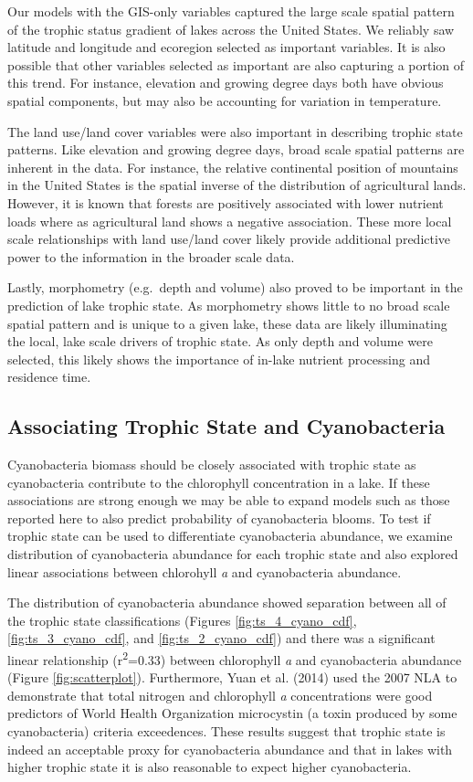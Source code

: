 \documentclass[11pt,]{article}
\begin{document}
Our models with the GIS-only variables captured the large scale spatial
pattern of the trophic status gradient of lakes across the United
States. We reliably saw latitude and longitude and ecoregion selected as
important variables. It is also possible that other variables selected
as important are also capturing a portion of this trend. For instance,
elevation and growing degree days both have obvious spatial components,
but may also be accounting for variation in temperature.

The land use/land cover variables were also important in describing
trophic state patterns. Like elevation and growing degree days, broad
scale spatial patterns are inherent in the data. For instance, the
relative continental position of mountains in the United States is the
spatial inverse of the distribution of agricultural lands. However, it
is known that forests are positively associated with lower nutrient
loads where as agricultural land shows a negative association. These
more local scale relationships with land use/land cover likely provide
additional predictive power to the information in the broader scale
data.

Lastly, morphometry (e.g.~depth and volume) also proved to be important
in the prediction of lake trophic state. As morphometry shows little to
no broad scale spatial pattern and is unique to a given lake, these data
are likely illuminating the local, lake scale drivers of trophic state.
As only depth and volume were selected, this likely shows the importance
of in-lake nutrient processing and residence time.

\subsection{Associating Trophic State and
Cyanobacteria}\label{associating-trophic-state-and-cyanobacteria}

Cyanobacteria biomass should be closely associated with trophic state as
cyanobacteria contribute to the chlorophyll concentration in a lake. If
these associations are strong enough we may be able to expand models
such as those reported here to also predict probability of cyanobacteria
blooms. To test if trophic state can be used to differentiate
cyanobacteria abundance, we examine distribution of cyanobacteria
abundance for each trophic state and also explored linear associations
between chlorohyll \emph{a} and cyanobacteria abundance.

The distribution of cyanobacteria abundance showed separation between
all of the trophic state classifications (Figures
\ref{fig:ts_4_cyano_cdf}, \ref{fig:ts_3_cyano_cdf}, and
\ref{fig:ts_2_cyano_cdf}) and there was a significant linear
relationship (r\textsuperscript{2}=0.33) between chlorophyll \emph{a}
and cyanobacteria abundance (Figure \ref{fig:scatterplot}). Furthermore,
Yuan et al. (2014) used the 2007 NLA to demonstrate that total nitrogen
and chlorophyll \emph{a} concentrations were good predictors of World
Health Organization microcystin (a toxin produced by some cyanobacteria)
criteria exceedences. These results suggest that trophic state is indeed
an acceptable proxy for cyanobacteria abundance and that in lakes with
higher trophic state it is also reasonable to expect higher
cyanobacteria.
\end{document}
